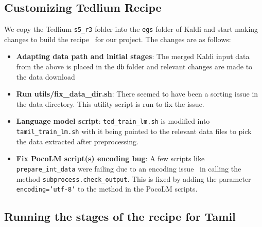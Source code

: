 \documentclass[11pt]{article} \usepackage{spconf,amsmath,graphicx}
\begin{document}
\begin{itemize}
\begin{figure}[h]
	\end{figure}



\end{itemize}

\subsection{Customizing Tedlium Recipe}
We copy the Tedlium \texttt{s5\_r3} folder into the \texttt{egs} folder of Kaldi and start making changes to build the recipe~\cite{kalditamtel} for our project.
The changes are as follows:
\begin{itemize}
	\item \textbf{Adapting data path and initial stages}: The merged Kaldi input data from the above is placed in the \texttt{db} folder and relevant changes are made to the data download
	\item \textbf{Run utils/fix\_data\_dir.sh}: There seemed to have been a sorting issue in the data directory. This utility script is run to fix the issue.
	\item \textbf{Language model script}: \texttt{ted\_train\_lm.sh} is modified into \texttt{tamil\_train\_lm.sh} with it being pointed to the relevant data files to pick the data extracted after preprocessing.
	\item \textbf{Fix PocoLM script(s) encoding bug}: A few scripts like \texttt{prepare\_int\_data} were failing due to an encoding issue~\cite{encodingbug} in calling the method \texttt{subprocess.check\_output}. This is fixed by adding the parameter \texttt{encoding='utf-8'} to the method in the PocoLM scripts.
\end{itemize}

\subsection{Running the stages of the recipe for Tamil}
\end{document}
